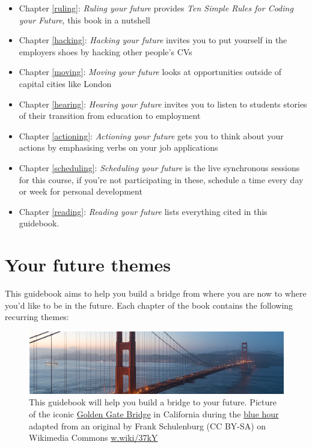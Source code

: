 \documentclass[
]{book}
\providecommand{\tightlist}{%
  \setlength{\itemsep}{0pt}\setlength{\parskip}{0pt}}
\begin{document}
\begin{itemize}
\tightlist
\item
  Chapter \ref{ruling}: \emph{Ruling your future} provides \emph{Ten Simple Rules for Coding your Future}, this book in a nutshell
\item
  Chapter \ref{hacking}: \emph{Hacking your future} invites you to put yourself in the employers shoes by hacking other people's CVs
\item
  Chapter \ref{moving}: \emph{Moving your future} looks at opportunities outside of capital cities like London
\item
  Chapter \ref{hearing}: \emph{Hearing your future} invites you to listen to students stories of their transition from education to employment
\item
  Chapter \ref{actioning}: \emph{Actioning your future} gets you to think about your actions by emphasising verbs on your job applications
\item
  Chapter \ref{scheduling}: \emph{Scheduling your future} is the live synchronous sessions for this course, if you're not participating in these, schedule a time every day or week for personal development
\item
  Chapter \ref{reading}: \emph{Reading your future} lists everything cited in this guidebook.
\end{itemize}

\hypertarget{themes}{%
\section{Your future themes}\label{themes}}

This guidebook aims to help you build a bridge from where you are now to where you'd like to be in the future. Each chapter of the book contains the following recurring themes:

\begin{figure}

{\centering \includegraphics[width=1\linewidth]{images/goldengate} 

}

\caption{This guidebook will help you build a bridge to your future. Picture of the iconic \href{https://en.wikipedia.org/wiki/Golden_Gate_Bridge}{Golden Gate Bridge} in California during the \href{https://en.wikipedia.org/wiki/Blue_hour}{blue hour} adapted from an original by Frank Schulenburg (CC BY-SA) on Wikimedia Commons \href{https://w.wiki/37kY}{w.wiki/37kY}}\label{fig:goldengate-fig}
\end{figure}
\end{document}
